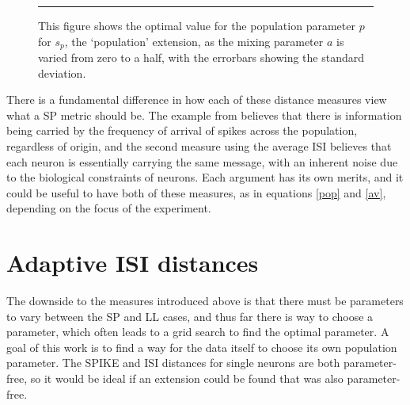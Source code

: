 \begin{figure}[htb]

\bigskip
\rule{35em}{0.5pt}
\caption{This figure shows the optimal value for the population parameter $p$ for $s_p$, the \lq{}population\rq{} extension, as the mixing parameter $a$ is varied from zero to a half, with the errorbars showing the standard deviation.}
\end{figure}
%

There is a fundamental difference in how each of these distance measures view what a SP metric should be.  The example from \citep{KreuzEtAl2009a} believes that there is information being carried by the frequency of arrival of spikes across the population, regardless of origin, and the second measure using the average ISI believes that each neuron is essentially carrying the same message, with an inherent noise due to the biological constraints of neurons.  Each argument has its own merits, and it could be useful to have both of these measures, as in equations \ref{pop} and \ref{av}, depending on the focus of the experiment.


\newpage
\section{Adaptive ISI distances}

The downside to the measures introduced above is that there must be parameters to vary between the SP and LL cases, and thus far there is way to choose a parameter, which often leads to a grid search to find the optimal parameter.  A goal of this work is to find a way for the data itself to choose its own population parameter.  The SPIKE and ISI distances for single neurons are both parameter-free, so it would be ideal if an extension could be found that was also parameter-free.

